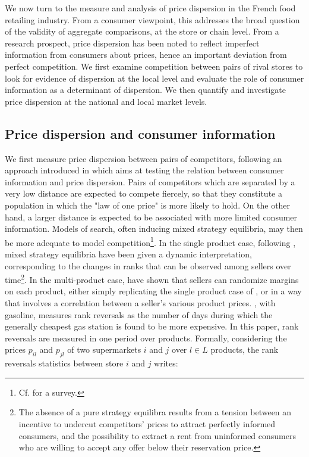 \documentclass[english]{article}
\begin{document}
We now turn to the measure and analysis of price dispersion in the French food retailing industry. From a consumer viewpoint, this addresses the broad question of the validity of aggregate comparisons, at the store or chain level. From a research prospect, price dispersion has been noted to reflect imperfect information from consumers about prices, hence an important deviation from perfect competition. We first examine competition between pairs of rival stores to look for evidence of dispersion at the local level and evaluate the role of consumer information as a determinant of dispersion. We then quantify and investigate price dispersion at the national and local market levels.

\subsection{Price dispersion and consumer information}

We first measure price dispersion between pairs of competitors, following an approach introduced in \cite{CHA11} which aims at testing the relation between consumer information and price dispersion. Pairs of competitors which are separated by a very low distance are expected to compete fiercely, so that they constitute a population in which the "law of one price" is more likely to hold. On the other hand, a larger distance is expected to be associated with more limited consumer information. Models of search, often inducing mixed strategy equilibria, may then be more adequate to model competition\footnote{Cf. \cite{BAY06} for a survey.}. In the single product case, following \cite{VAR80}, mixed strategy equilibria have been given a dynamic interpretation, corresponding to the changes in ranks that can be observed among sellers over time\footnote{The absence of a pure strategy equilibra results from a tension between an incentive to undercut competitors' prices to attract perfectly informed consumers, and the possibility to extract a rent from uninformed consumers who are willing to accept any offer below their reservation price.}. In the multi-product case, \cite{MCA95} have shown that sellers can randomize margins on each product, either simply replicating the single product case of \cite{VAR80}, or in a way that involves a correlation between a seller's various product prices. \cite{CHA11}, with gasoline, measures rank reversals as the number of days during which the generally cheapest gas station is found to be more expensive. In this paper, rank reversals are measured in one period over products. Formally, considering the prices $p_{il}$ and $p_{jl}$ of two supermarkets $i$ and $j$ over $l \in L$ products, the rank reversals statistics between store $i$ and $j$ writes:
\end{document}
